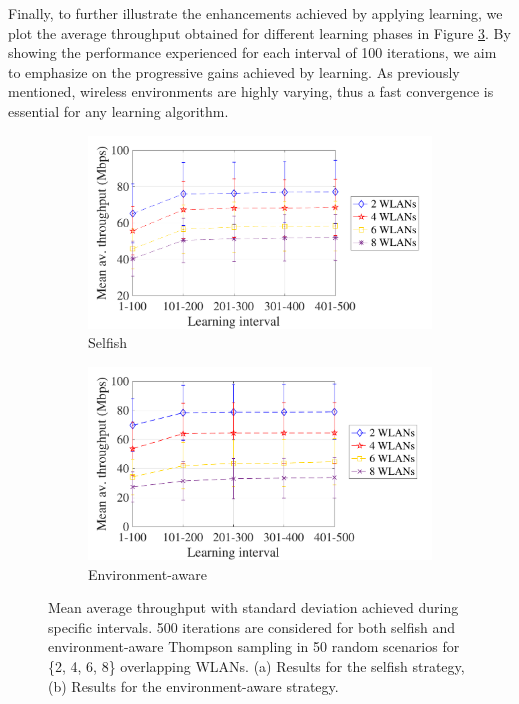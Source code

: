 \documentclass[preprint,12pt]{elsarticle}
\begin{document}
Finally, to further illustrate the enhancements achieved by applying learning, we plot the average throughput obtained for different learning phases in Figure \ref{fig:cumulative_tpt}. By showing the performance experienced for each interval of 100 iterations, we aim to emphasize on the progressive gains achieved by learning. As previously mentioned, wireless environments are highly varying, thus a fast convergence is essential for any learning algorithm.

\begin{figure}[h!]
	\centering
	\begin{subfigure}[b]{0.4\textwidth}
		\includegraphics[width=\textwidth]{scalability_selfish_learning_iterations}
		\caption{Selfish}
		\label{fig:scalability_selfish_accumulated}
	\end{subfigure}
	\begin{subfigure}[b]{0.4\textwidth}
		\includegraphics[width=\textwidth]{scalability_informed_learning_iterations}
		\caption{Environment-aware}
		\label{fig:scalability_informed_accumulated}
	\end{subfigure}
	\caption{Mean average throughput with standard deviation achieved during specific intervals. 500 iterations are considered for both selfish and environment-aware Thompson sampling in 50 random scenarios for \{2, 4, 6, 8\} overlapping WLANs. (a) Results for the selfish strategy, (b) Results for the environment-aware strategy.}
	\label{fig:cumulative_tpt}
\end{figure}
\end{document}
